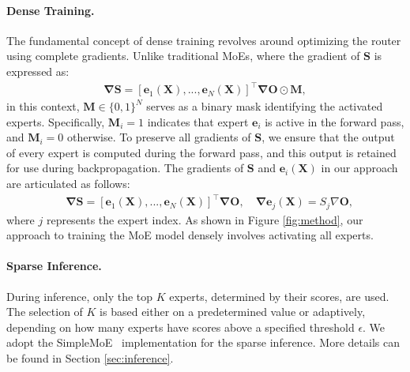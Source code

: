 \paragraph{Dense Training.} 
The fundamental concept of dense training revolves around optimizing the router using complete gradients. Unlike traditional MoEs, where the gradient of \(\mathbf{S}\) is expressed as:
\begin{align}
    \mathbf{\nabla S} = \left[\mathbf{e}_1(\mathbf{X}),..., \mathbf{e}_N(\mathbf{X})\right]^\intercal \mathbf{\nabla O} \odot \mathbf{M},
\end{align}
in this context, \(\mathbf{M}\in \{0,1\}^{N}\) serves as a binary mask identifying the activated experts. Specifically, \(\mathbf{M}_{i}=1\) indicates that expert \(\mathbf{e}_i\) is active in the forward pass, and \(\mathbf{M}_{i}=0\) otherwise. To preserve all gradients of \(\mathbf{S}\), we ensure that the output of every expert is computed during the forward pass, and this output is retained for use during backpropagation. The gradients of \(\mathbf{S}\) and \(\mathbf{e}_i(\mathbf{X})\) in our approach are articulated as follows:
\begin{align}
    & \mathbf{\nabla S} = \left[\mathbf{e}_1(\mathbf{X}),..., \mathbf{e}_N(\mathbf{X})\right]^\intercal \mathbf{\nabla O}, \quad
     \mathbf{\nabla e}_j\mathbf{(X)} = S_j\nabla \mathbf{O},
\end{align}
where $j$ represents the expert index. As shown in Figure \ref{fig:method}, our approach to training the MoE model densely involves activating all experts. 

\paragraph{Sparse Inference.}
During inference, only the top \(K\) experts, determined by their scores, are used. The selection of \(K\) is based either on a predetermined value or adaptively, depending on how many experts have scores above a specified threshold \(\epsilon\). We adopt the SimpleMoE~\cite{tan2024scattered} implementation for the sparse inference. More details can be found in Section \ref{sec:inference}.

